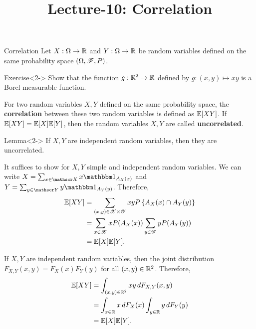 \documentclass[12pt,aspectratio=169]{beamer}
\title{Lecture-10: Correlation}
\date{}
\begin{document}
\pagestyle{empty}
\maketitle

\begin{frame}{Correlation}
Let $X:\Omega\to\mathbb{R}$ and $Y:\Omega\to\mathbb{R}$ be random variables defined on the same probability space $(\Omega,\mathscr{F},P)$. 


\begin{block}{Exercise}<2->
Show that the function $g: \mathbb{R}^2 \to \mathbb{R}$ defined by $g: (x,y) \mapsto xy$ is a Borel measurable function. 
\end{block}
\end{frame}
\begin{frame}
\begin{Definition}[Correlation] 
For two random variables $X,Y$ defined on the same probability space, 
the \textbf{correlation} between these two random variables is defined as $\mathbb{E}[XY]$. 
If $\mathbb{E}[XY] = \mathbb{E}[X]\mathbb{E}[Y]$, then the random variables $X,Y$ are called \textbf{uncorrelated}. 
\end{Definition}
\begin{block}{Lemma}<2->
If $X, Y$ are independent random variables, then they are uncorrelated. 
\end{block}
\end{frame}
\begin{frame}
\begin{Proof}
It suffices to show for $X,Y$ simple and independent random variables.
We can write $X = \sum_{x\in \sX}x\Ind{A_X(x)}$ and  $Y = \sum_{y\in \sY}y\Ind{A_Y(y)}$. 
Therefore, 
\begin{align*}
\mathbb{E}[XY] 
&= \sum_{(x,y) \in \mathscr{X}\times\mathscr{Y}}xyP\left\{A_X(x)\cap A_Y(y)\right\}\\
&=  \sum_{x \in \mathscr{X}}xP(A_X(x)) \sum_{y \in \mathscr{Y}}yP(A_Y(y))\\ 
&= \mathbb{E}[X]\mathbb{E}[Y].
\end{align*}
\end{Proof}
\end{frame}
\begin{frame}
\begin{Proof}
If $X, Y$ are independent random variables, 
then the joint distribution $F_{X,Y}(x,y) = F_X(x)F_Y(y)$ for all $(x,y) \in \mathbb{R}^2$.
Therefore, 
\begin{align*}
\mathbb{E}[XY] 
&= \int_{(x,y) \in \mathbb{R}^2} x y \, dF_{X,Y}(x,y) \\
&= \int_{x \in \mathbb{R}} x \, dF_X(x) \int_{y \in \mathbb{R}} y \, dF_Y(y) \\
&= \mathbb{E}[X] \mathbb{E}[Y].
\end{align*}
\end{Proof}
\end{frame}
\end{document}
